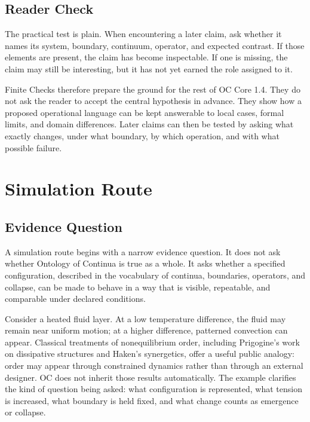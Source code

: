 \documentclass[11pt,a4paper,openany]{book}
\begin{document}
\subsection{Reader Check}
The practical test is plain. When encountering a later claim, ask whether it names its system, boundary, continuum, operator, and expected contrast. If those elements are present, the claim has become inspectable. If one is missing, the claim may still be interesting, but it has not yet earned the role assigned to it. \cite{kadanoff_scaling,wilson_renormalization}\par
Finite Checks therefore prepare the ground for the rest of OC Core 1.4. They do not ask the reader to accept the central hypothesis in advance. They show how a proposed operational language can be kept answerable to local cases, formal limits, and domain differences. Later claims can then be tested by asking what exactly changes, under what boundary, by which operation, and with what possible failure.\par
\section{Simulation Route}
\subsection{Evidence Question}
A simulation route begins with a narrow evidence question. It does not ask whether Ontology of Continua is true as a whole. It asks whether a specified configuration, described in the vocabulary of continua, boundaries, operators, and collapse, can be made to behave in a way that is visible, repeatable, and comparable under declared conditions. \cite{wilson_renormalization,landau_stat_physics}\par
Consider a heated fluid layer. At a low temperature difference, the fluid may remain near uniform motion; at a higher difference, patterned convection can appear. Classical treatments of nonequilibrium order, including Prigogine's work on dissipative structures and Haken's synergetics, offer a useful public analogy: order may appear through constrained dynamics rather than through an external designer. OC does not inherit those results automatically. The example clarifies the kind of question being asked: what configuration is represented, what tension is increased, what boundary is held fixed, and what change counts as emergence or collapse.\par
\end{document}
